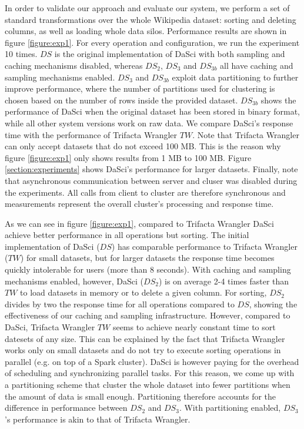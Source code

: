 \documentclass[10pt, a4paper, twocolumn]{article} %
\begin{document}
In order to validate our approach and evaluate our system, we perform a set of standard transformations over the whole Wikipedia dataset: sorting and deleting columns, as well as loading whole data silos.
Performance results are shown in figure \ref{figure:exp1}. 
For every operation and configuration, we run the experiment 10 times.
$DS$ is the original implementation of DaSci with both sampling and caching mechanisms disabled, whereas $DS_2$, $DS_3$ and $DS_{3b}$ all have caching and sampling mechanisms enabled.
$DS_3$ and $DS_{3b}$ exploit data partitioning to further improve performance, where the number of partitions used for clustering is chosen based on the number of rows inside the provided dataset.
$DS_{3b}$ shows the performance of DaSci when the original dataset has been stored in binary format, while all other system versions work on raw data.
We compare DaSci's response time with the performance of Trifacta Wrangler $TW$.
Note that Trifacta Wrangler can only accept datasets that do not exceed 100 MB. This is the reason why figure \ref{figure:exp1} only shows results from 1 MB to 100 MB.
Figure \ref{section:experiments} shows DaSci's performance for larger datasets.
Finally, note that asynchronous communication between server and cluser was disabled during the experiments. All calls from client to cluster are therefore synchronous and measurements represent the overall cluster's processing and response time.

As we can see in figure \ref{figure:exp1}, compared to Trifacta Wrangler DaSci achieve better performance in all operations but sorting.
The initial implementation of DaSci ($DS$) has comparable performance to Trifacta Wrangler ($TW$) for small datasets, but for larger datasets the response time becomes quickly intolerable for users (more than 8 seconds).
With caching and sampling mechanisms enabled, however, DaSci ($DS_2$) is on average 2-4 times faster than $TW$ to load datasets in memory or to delete a given column.
For sorting, $DS_2$ divides by two the response time for all operations compared to $DS$, showing the effectiveness of our caching and sampling infrastructure. 
However, compared to DaSci, Trifacta Wrangler $TW$ seems to achieve nearly constant time to sort datesets of any size. This can be explained by the fact that Trifacta Wrangler works only on small datasets and do not try to execute sorting operations in parallel (e.g. on top of a Spark cluster). DaSci is however paying for the overhead of scheduling and synchronizing parallel tasks. 
For this reason, we come up with a partitioning scheme that cluster the whole dataset into fewer partitions when the amount of data is small enough. Partitioning therefore accounts for the difference in performance between $DS_2$ and $DS_3$.
With partitioning enabled, $DS_3$'s performance is akin to that of Trifacta Wrangler.
\end{document}
